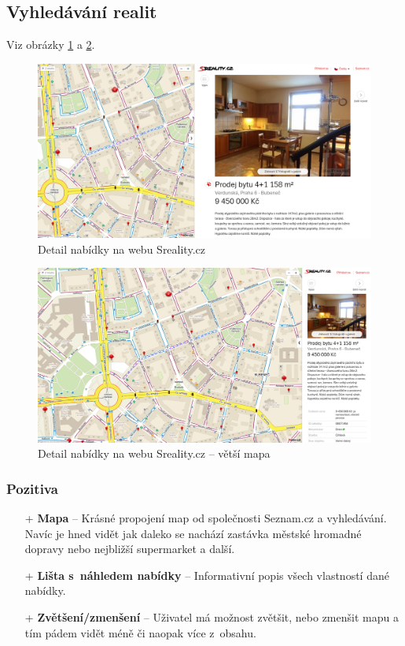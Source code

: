 
\newpage
\subsection{Vyhledávání realit}
Viz obrázky \ref{fig:sreality:detail} a \ref{fig:sreality:detail-big-map}.
\begin{figure}[h]
    \centering
    \includegraphics[width=1.0\textwidth]{media/sreality/detail.png}
    \caption{Detail nabídky na webu Sreality.cz}
    \label{fig:sreality:detail}
\end{figure}
\begin{figure}[h]
    \centering
    \includegraphics[width=1.0\textwidth]{media/sreality/detail-big-map.png}
    \caption{Detail nabídky na webu Sreality.cz -- větší mapa}
    \label{fig:sreality:detail-big-map}
\end{figure}
\subsubsection*{Pozitiva}
\begin{itemize}
    \item[+] \textbf{Mapa} -- Krásné propojení map od společnosti Seznam.cz a vyhledávání. Navíc je hned vidět jak daleko se nachází zastávka městské hromadné dopravy nebo nejbližší supermarket a další.
    \item[+] \textbf{Lišta s~náhledem nabídky} -- Informativní popis všech vlastností dané nabídky.
    \item[+] \textbf{Zvětšení/zmenšení} -- Uživatel má možnost zvětšit, nebo zmenšit mapu a tím pádem vidět méně či naopak více z~obsahu.
\end{itemize}
